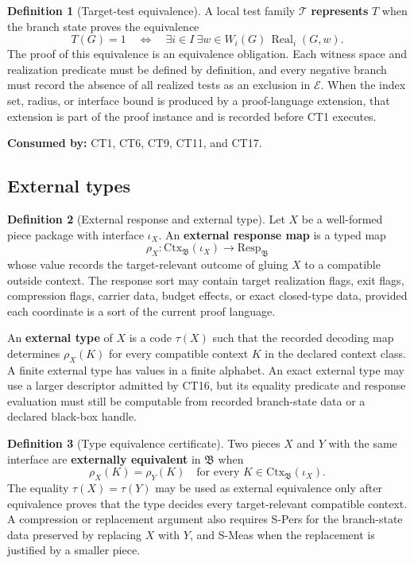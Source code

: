 \documentclass[
  11pt,
]{article}
\theoremstyle{definition}
\newtheorem{definition}{Definition}[section]
\begin{document}
\begin{definition}[Target-test equivalence]\label{def:target-test-equivalence}
A local test family \(\mathcal T\) \textbf{represents} \(T\) when the
branch state proves the equivalence
\[
T(G)=1
\quad\Longleftrightarrow\quad
\exists i\in I\ \exists w\in W_i(G)\,
  \operatorname{Real}_i(G,w).
\]
The proof of this equivalence is an equivalence obligation.  Each witness
space and realization predicate must be defined by definition, and every
negative branch must record the absence of all realized tests as an
exclusion in \(\mathcal E\).  When the index set, radius, or interface
bound is produced by a proof-language extension, that extension is part
of the proof instance and is recorded before CT1 executes.
\end{definition}

\noindent\textbf{Consumed by:} CT1, CT6, CT9, CT11, and CT17.

\subsection{External types}\label{data-external-types}
\begin{definition}[External response and external type]\label{def:external-type}
Let \(X\) be a well-formed piece package with interface \(\iota_X\).  An
\textbf{external response map} is a typed map
\[
\rho_X:\mathrm{Ctx}_{\mathfrak B}(\iota_X)\longrightarrow
\mathrm{Resp}_{\mathfrak B}
\]
whose value records the target-relevant outcome of gluing \(X\) to a
compatible outside context.  The response sort may contain target
realization flags, exit flags, compression flags, carrier data, budget
effects, or exact closed-type data, provided each coordinate is a sort
of the current proof language.

An \textbf{external type} of \(X\) is a code \(\tau(X)\) such that the
recorded decoding map determines \(\rho_X(K)\) for every compatible
context \(K\) in the declared context class.  A finite external type has
values in a finite alphabet.  An exact external type may use a larger
descriptor admitted by CT16, but its equality predicate and response
evaluation must still be computable from recorded branch-state data or a
declared black-box handle.
\end{definition}

\begin{definition}[Type equivalence certificate]\label{def:type-equivalence-certificate}
Two pieces \(X\) and \(Y\) with the same interface are
\textbf{externally equivalent} in \(\mathfrak B\) when
\[
\rho_X(K)=\rho_Y(K)
\quad\text{for every }K\in\mathrm{Ctx}_{\mathfrak B}(\iota_X).
\]
The equality \(\tau(X)=\tau(Y)\) may be used as external equivalence
only after equivalence proves that the type decides every target-relevant
compatible context.  A compression or replacement argument also requires
S-Pers for the branch-state data preserved by replacing \(X\) with
\(Y\), and S-Meas when the replacement is justified by a smaller piece.
\end{definition}
\end{document}
